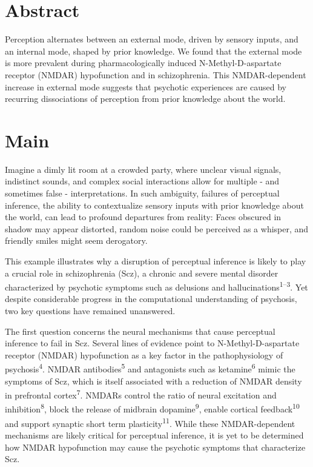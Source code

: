\documentclass[
]{article}
\begin{document}
\hypertarget{abstract}{%
\section{Abstract}\label{abstract}}

Perception alternates between an external mode, driven by sensory
inputs, and an internal mode, shaped by prior knowledge. We found that
the external mode is more prevalent during pharmacologically induced
N-Methyl-D-aspartate receptor (NMDAR) hypofunction and in schizophrenia.
This NMDAR-dependent increase in external mode suggests that psychotic
experiences are caused by recurring dissociations of perception from
prior knowledge about the world.

\hypertarget{main}{%
\section{Main}\label{main}}

Imagine a dimly lit room at a crowded party, where unclear visual
signals, indistinct sounds, and complex social interactions allow for
multiple - and sometimes false - interpretations. In such ambiguity,
failures of perceptual inference, the ability to contextualize sensory
inputs with prior knowledge about the world, can lead to profound
departures from reality: Faces obscured in shadow may appear distorted,
random noise could be perceived as a whisper, and friendly smiles might
seem derogatory.

This example illustrates why a disruption of perceptual inference is
likely to play a crucial role in schizophrenia (Scz), a chronic and
severe mental disorder characterized by psychotic symptoms such as
delusions and hallucinations\textsuperscript{1--3}. Yet despite
considerable progress in the computational understanding of psychosis,
two key questions have remained unanswered.

The first question concerns the neural mechanisms that cause perceptual
inference to fail in Scz. Several lines of evidence point to
N-Methyl-D-aspartate receptor (NMDAR) hypofunction as a key factor in
the pathophysiology of psychosis\textsuperscript{4}. NMDAR
antibodies\textsuperscript{5} and antagonists such as
ketamine\textsuperscript{6} mimic the symptoms of Scz, which is itself
associated with a reduction of NMDAR density in prefrontal
cortex\textsuperscript{7}. NMDARs control the ratio of neural excitation
and inhibition\textsuperscript{8}, block the release of midbrain
dopamine\textsuperscript{9}, enable cortical
feedback\textsuperscript{10} and support synaptic short term
plasticity\textsuperscript{11}. While these NMDAR-dependent mechanisms
are likely critical for perceptual inference, it is yet to be determined
how NMDAR hypofunction may cause the psychotic symptoms that
characterize Scz.
\end{document}
